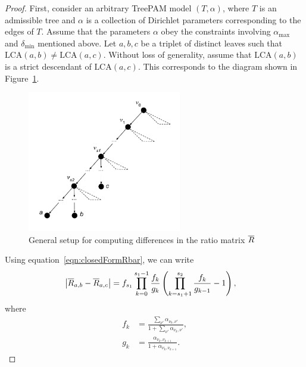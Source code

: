 \documentclass{article}
\theoremstyle{definition}
\newcommand{\deltaMin}{\delta_{\text{min}}}
\newcommand{\alphaMax}{\alpha_{\text{max}}}
\newcommand{\LCA}{\text{LCA}}
\begin{document}
\begin{proof}
First, consider an arbitrary TreePAM model $(T, \alpha)$, where $T$ is an admissible tree and $\alpha$ is a collection of Dirichlet parameters corresponding to the edges of $T$.
Assume that the parameters $\alpha$ obey the constraints involving $\alphaMax$ and $\deltaMin$ mentioned above.
Let $a, b, c$ be a triplet of distinct leaves such that $\LCA(a,b) \neq \LCA(a,c)$.
Without loss of generality, assume that $\LCA(a,b)$ is a strict descendant of $\LCA(a,c)$.
This corresponds to the diagram shown in Figure~\ref{fig:general-min-diff-setup}.

\begin{figure}[h]
    \centering
    \includegraphics[width=0.6\textwidth]{figures/general-min-diff-setup.pdf}
    \caption{General setup for computing differences in the ratio matrix $\overline{R}$}
    \label{fig:general-min-diff-setup}
\end{figure}

Using equation~\eqref{eqn:closedFormRbar}, we can write
\begin{align*}
\left\lvert \overline{R}_{a,b} - \overline{R}_{a,c} \right\rvert
&=
f_{s_1}
\prod_{k=0}^{s_1-1} \frac{f_k}{g_k}
\left(
  \prod_{k=s_1+1}^{s_2} \frac{f_k}{g_{k-1}}
  - 1
\right),
\end{align*}
where
\begin{align*}
f_k &= \frac{ \sum_{\nu'} \alpha_{\nu_k,\nu'} }
            { 1 + \sum_{\nu'} \alpha_{\nu_k,\nu'} },
\\
g_k &= \frac{ \alpha_{\nu_k,\nu_{k+1}} }
            { 1 + \alpha_{\nu_k,\nu_{k+1}} }.
\end{align*}


\end{proof}
\end{document}
